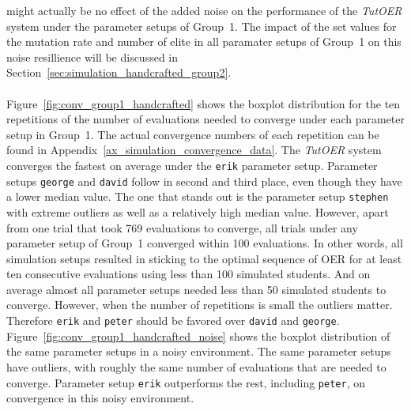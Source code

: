 might actually be no effect of the added noise on the performance of the
\emph{TutOER} system under the parameter setups of Group~1. The impact of the
set values for the mutation rate and number of elite in all paramater setups of
Group~1 on this noise resillience will be discussed in
Section~\ref{sec:simulation_handcrafted_group2}.\\\\
\noindent
Figure~\ref{fig:conv_group1_handcrafted} shows the boxplot distribution for the ten
repetitions of the number of evaluations needed to converge under each
parameter setup in Group~1. The actual convergence numbers of each repetition
can be found in Appendix~\ref{ax_simulation_convergence_data}. The \emph{TutOER} system
converges the fastest on average under the \texttt{erik} parameter setup.
Parameter setups \texttt{george} and \texttt{david} follow in second and third
place, even though they have a lower median value. The one that stands out is
the parameter setup \texttt{stephen} with extreme outliers as well as a
relatively high median value. However, apart from one trial that took 769
evaluations to converge, all trials under any parameter setup of Group~1
converged within 100 evaluations. In other words, all simulation setups
resulted in sticking to the optimal sequence of OER for at least ten
consecutive evaluations using less than 100 simulated students. And on average
almost all parameter setups needed less than 50 simulated students to
converge. However, when the number of repetitions is small the outliers matter.
Therefore \texttt{erik} and \texttt{peter} should be favored over
\texttt{david} and \texttt{george}. Figure~\ref{fig:conv_group1_handcrafted_noise}
shows the boxplot distribution of the same parameter setups in a noisy
environment. The same parameter setups have outliers, with roughly the same
number of evaluations that are needed to converge. Parameter setup
\texttt{erik} outperforms the rest, including \texttt{peter}, on convergence in
this noisy environment.
